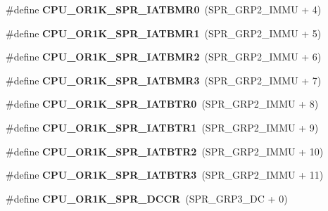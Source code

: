 \begin{DoxyCompactItemize}
\mbox{\label{or1k-utility_8h_adc9f0f9c0342a057b65165898ecc256c}} 
\#define {\bfseries C\+P\+U\+\_\+\+O\+R1\+K\+\_\+\+S\+P\+R\+\_\+\+I\+A\+T\+B\+M\+R0}~(S\+P\+R\+\_\+\+G\+R\+P2\+\_\+\+I\+M\+MU + 4)
\item 
\mbox{\label{or1k-utility_8h_a2c3de1079f18ce658006561049447b18}} 
\#define {\bfseries C\+P\+U\+\_\+\+O\+R1\+K\+\_\+\+S\+P\+R\+\_\+\+I\+A\+T\+B\+M\+R1}~(S\+P\+R\+\_\+\+G\+R\+P2\+\_\+\+I\+M\+MU + 5)
\item 
\mbox{\label{or1k-utility_8h_aeba36d8ef52474d2520f1badf33872bc}} 
\#define {\bfseries C\+P\+U\+\_\+\+O\+R1\+K\+\_\+\+S\+P\+R\+\_\+\+I\+A\+T\+B\+M\+R2}~(S\+P\+R\+\_\+\+G\+R\+P2\+\_\+\+I\+M\+MU + 6)
\item 
\mbox{\label{or1k-utility_8h_ab84a46d63ebdc509ca2700e4531f9a73}} 
\#define {\bfseries C\+P\+U\+\_\+\+O\+R1\+K\+\_\+\+S\+P\+R\+\_\+\+I\+A\+T\+B\+M\+R3}~(S\+P\+R\+\_\+\+G\+R\+P2\+\_\+\+I\+M\+MU + 7)
\item 
\mbox{\label{or1k-utility_8h_a2635512a8f9dada04dc05ad48993f772}} 
\#define {\bfseries C\+P\+U\+\_\+\+O\+R1\+K\+\_\+\+S\+P\+R\+\_\+\+I\+A\+T\+B\+T\+R0}~(S\+P\+R\+\_\+\+G\+R\+P2\+\_\+\+I\+M\+MU + 8)
\item 
\mbox{\label{or1k-utility_8h_aa6082e987ca5064193e12aa516377429}} 
\#define {\bfseries C\+P\+U\+\_\+\+O\+R1\+K\+\_\+\+S\+P\+R\+\_\+\+I\+A\+T\+B\+T\+R1}~(S\+P\+R\+\_\+\+G\+R\+P2\+\_\+\+I\+M\+MU + 9)
\item 
\mbox{\label{or1k-utility_8h_a92f89152c17868ac22b06b14c78b0c6a}} 
\#define {\bfseries C\+P\+U\+\_\+\+O\+R1\+K\+\_\+\+S\+P\+R\+\_\+\+I\+A\+T\+B\+T\+R2}~(S\+P\+R\+\_\+\+G\+R\+P2\+\_\+\+I\+M\+MU + 10)
\item 
\mbox{\label{or1k-utility_8h_a32fcd056ccc5844427925ae98784ede6}} 
\#define {\bfseries C\+P\+U\+\_\+\+O\+R1\+K\+\_\+\+S\+P\+R\+\_\+\+I\+A\+T\+B\+T\+R3}~(S\+P\+R\+\_\+\+G\+R\+P2\+\_\+\+I\+M\+MU + 11)
\item 
\mbox{\label{or1k-utility_8h_ac889b259a13d966186984fb7e0fb3e42}} 
\#define {\bfseries C\+P\+U\+\_\+\+O\+R1\+K\+\_\+\+S\+P\+R\+\_\+\+D\+C\+CR}~(S\+P\+R\+\_\+\+G\+R\+P3\+\_\+\+DC + 0)

\end{DoxyCompactItemize}
